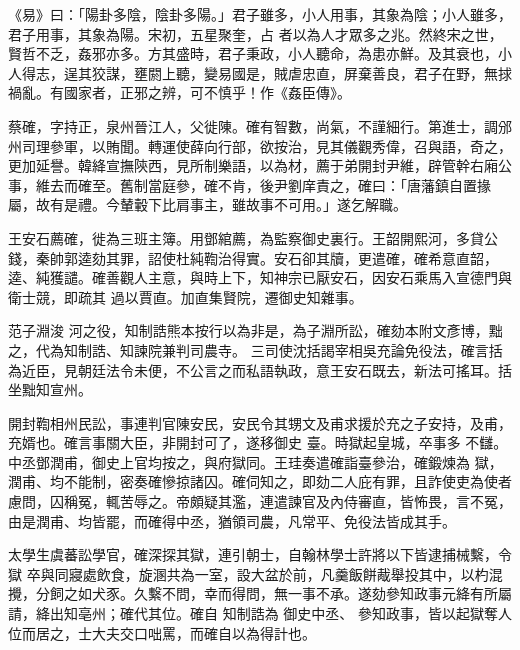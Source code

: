 
\begin{pinyinscope}

 《易》曰：「陽卦多陰，陰卦多陽。」君子雖多，小人用事，其象為陰；小人雖多，君子用事，其象為陽。宋初，五星聚奎，占
 者以為人才眾多之兆。然終宋之世，賢哲不乏，姦邪亦多。方其盛時，君子秉政，小人聽命，為患亦鮮。及其衰也，小人得志，逞其狡謀，壅閼上聽，變易國是，賊虐忠直，屏棄善良，君子在野，無捄禍亂。有國家者，正邪之辨，可不慎乎！作《姦臣傳》。



 蔡確，字持正，泉州晉江人，父徙陳。確有智數，尚氣，不謹細行。第進士，調邠州司理參軍，以賄聞。轉運使薛向行部，欲按治，見其儀觀秀偉，召與語，奇之，更加延譽。韓絳宣撫陝西，見所制樂語，以為材，薦于弟開封尹維，辟管幹右廂公事，維去而確至。舊制當庭參，確不肯，後尹劉庠責之，確曰：「唐藩鎮自置掾屬，故有是禮。今輦轂下比肩事主，雖故事不可用。」遂乞解職。



 王安石薦確，徙為三班主簿。用鄧綰薦，為監察御史裏行。王韶開熙河，多貸公錢，秦帥郭逵劾其罪，詔使杜純鞫治得實。安石卻其牘，更遣確，確希意直韶，逵、純獲譴。確善觀人主意，與時上下，知神宗已厭安石，因安石乘馬入宣德門與衛士競，即疏其
 過以賈直。加直集賢院，遷御史知雜事。



 范子淵浚
 河之役，知制誥熊本按行以為非是，為子淵所訟，確劾本附文彥博，黜之，代為知制誥、知諫院兼判司農寺。
 三司使沈括謁宰相吳充論免役法，確言括為近臣，見朝廷法令未便，不公言之而私語執政，意王安石既去，新法可搖耳。括坐黜知宣州。



 開封鞫相州民訟，事連判官陳安民，安民令其甥文及甫求援於充之子安持，及甫，充婿也。確言事關大臣，非開封可了，遂移御史
 臺。時獄起皇城，卒事多
 不讎。中丞鄧潤甫，御史上官均按之，與府獄同。王珪奏遣確詣臺參治，確鍛煉為
 獄，潤甫、均不能制，密奏確慘掠諸囚。確伺知之，即劾二人庇有罪，且詐使吏為使者慮問，囚稱冤，輒苦辱之。帝頗疑其濫，連遣諫官及內侍審直，皆怖畏，言不冤，由是潤甫、均皆罷，而確得中丞，猶領司農，凡常平、免役法皆成其手。



 太學生虞蕃訟學官，確深探其獄，連引朝士，自翰林學士許將以下皆逮捕械繫，令獄
 卒與同寢處飲食，旋溷共為一室，設大盆於前，凡羹飯餅胾舉投其中，以杓混攪，分飼之如犬豕。久繫不問，幸而得問，無一事不承。遂劾參知政事元絳有所屬請，絳出知亳州；確代其位。確自
 知制誥為
 御史中丞、
 參知政事，皆以起獄奪人位而居之，士大夫交口咄罵，而確自以為得計也。




\end{pinyinscope}
